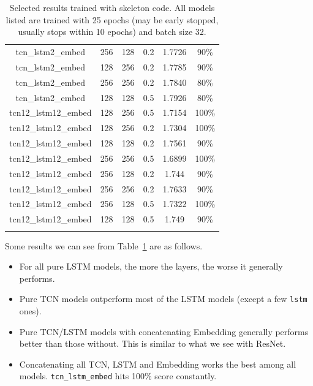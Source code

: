 \documentclass[12pt]{article}
\begin{document}
\begin{longtable}[c]{@{}>{\ttfamily}cccccc@{}}
	tcn\_lstm2\_embed    & 256            & 128         & 0.2          & 1.7726   & 90\%  \\
	tcn\_lstm2\_embed    & 128            & 256         & 0.2          & 1.7785   & 90\%  \\
	tcn\_lstm2\_embed    & 256            & 256         & 0.2          & 1.7840   & 80\%  \\
	tcn\_lstm2\_embed    & 128            & 128         & 0.5          & 1.7926   & 80\%  \\\midrule
	tcn12\_lstm12\_embed & 128            & 256         & 0.5          & 1.7154   & 100\% \\
	tcn12\_lstm12\_embed & 128            & 256         & 0.2          & 1.7304   & 100\% \\
	tcn12\_lstm12\_embed & 128            & 128         & 0.2          & 1.7561   & 90\%  \\
	tcn12\_lstm12\_embed & 256            & 256         & 0.5          & 1.6899   & 100\% \\
	tcn12\_lstm12\_embed & 256            & 128         & 0.2          & 1.744    & 90\%  \\
	tcn12\_lstm12\_embed & 256            & 256         & 0.2          & 1.7633   & 90\%  \\
	tcn12\_lstm12\_embed & 256            & 128         & 0.5          & 1.7322   & 100\% \\
	tcn12\_lstm12\_embed & 128            & 128         & 0.5          & 1.749    & 90\%  \\* \bottomrule
	\caption{Selected results trained with skeleton code. All models listed are trained with 25 epochs (may be early stopped, usually stops within 10 epochs) and batch size 32.}
	\label{tb:p1-results}                                                                 \\
\end{longtable}

\noindent Some results we can see from Table~\ref{tb:p1-results} are as follows.
\begin{itemize}
	\item For all pure LSTM models, the more the layers, the worse it generally performs.
	\item Pure TCN models outperform most of the LSTM models (except a few \texttt{lstm} ones).
	\item Pure TCN/LSTM models with concatenating Embedding generally performs better than those without. This is similar to what we see with ResNet.
	\item Concatenating all TCN, LSTM and Embedding works the best among all models. \texttt{tcn\_lstm\_embed} hits 100\% score constantly.
\end{itemize}
\end{document}
